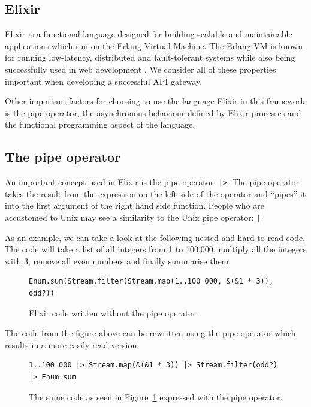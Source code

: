 \documentclass{cslthse-msc}
\begin{document}
\subsection{Elixir}
Elixir is a functional language designed for building scalable and maintainable applications which run on the Erlang Virtual Machine. The Erlang VM is known for running low-latency, distributed and fault-tolerant systems while also being successfully used in web development \cite{elixir}. We consider all of these properties important when developing a successful API gateway.

Other important factors for choosing to use the language Elixir in this framework is the pipe operator, the asynchronous behaviour defined by Elixir processes and the functional programming aspect of the language.

\subsection{The pipe operator}
An important concept used in Elixir is the pipe operator: \lstinline{|>}. The pipe operator takes the result from the expression on the left side of the operator and \enquote{pipes} it into the first argument of the right hand side function. People who are accustomed to Unix may see a similarity to the Unix pipe operator: \lstinline{|}.

\vspace{5mm}

\noindent As an example, we can take a look at the following nested and hard to read code. The code will take a list of all integers from 1 to 100,000, multiply all the integers with 3, remove all even numbers and finally summarise them:

\begin{figure}[H]
  \centering
\begin{lstlisting}[breaklines=true,frame=single]
Enum.sum(Stream.filter(Stream.map(1..100_000, &(&1 * 3)), odd?))
\end{lstlisting}
  \caption{Elixir code written without the pipe operator.}
  \label{fig:no_pipe}
\end{figure}

\noindent The code from the figure above can be rewritten using the pipe operator which results in a more easily read version:

\begin{figure}[H]
  \centering
\begin{lstlisting}[breaklines=true,frame=single]
1..100_000 |> Stream.map(&(&1 * 3)) |> Stream.filter(odd?) |> Enum.sum
\end{lstlisting}
  \caption{The same code as seen in Figure~\ref{fig:no_pipe} expressed with the pipe operator.}
\end{figure}
\end{document}
